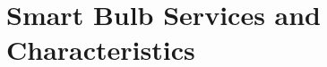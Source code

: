 \chapter{Smart Bulb Services and Characteristics}
\label{appendixB}
\thispagestyle{empty}

\newenvironment{changemargin}[2]{%
	\begin{list}{}{%
			\setlength{\topsep}{0pt}%
			\setlength{\leftmargin}{#1}%
			\setlength{\rightmargin}{#2}%
			\setlength{\listparindent}{\parindent}%
			\setlength{\itemindent}{\parindent}%
			\setlength{\parsep}{\parskip}%
		}%
		\item[]}
	{\end{list}
}

\begin{changemargin}{-1cm}{-1cm}

\end{changemargin}